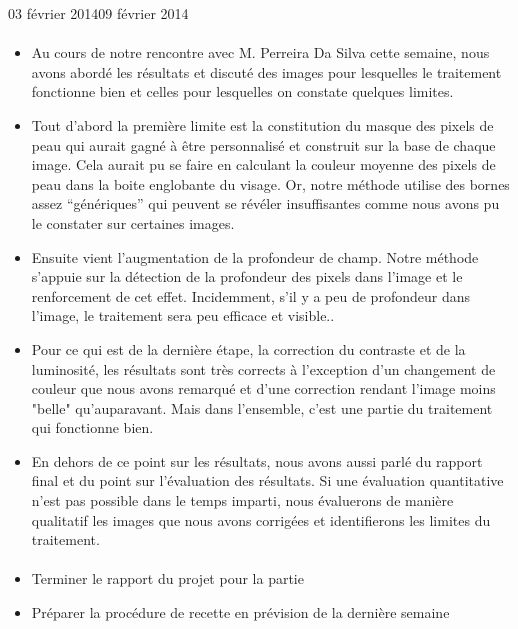 \documentclass[11pt, french]{report-rd-info}
\begin{document}
\begin{fichesuivi}{03 février 2014}{09 février 2014}
\paragraph{}
	\begin{echange}
		\begin{itemize}
			\item Au cours de notre rencontre avec M. Perreira Da Silva cette semaine, nous avons abordé les résultats et discuté des images pour lesquelles le traitement fonctionne bien et celles pour lesquelles on constate quelques limites.
			\item Tout d’abord la première limite est la constitution du masque des pixels de peau qui aurait gagné à être personnalisé et construit sur la base de chaque image. Cela aurait pu se faire en calculant la couleur moyenne des pixels de peau dans la boite englobante du visage. Or, notre méthode utilise des bornes assez “génériques” qui peuvent se révéler insuffisantes comme nous avons pu le constater sur certaines images.
			\item Ensuite vient l’augmentation de la profondeur de champ. Notre méthode s’appuie sur la détection de la profondeur des pixels dans l’image et le renforcement de cet effet. Incidemment, s’il y a peu de profondeur dans l’image, le traitement sera peu efficace et visible..
	\item Pour ce qui est de la dernière étape, la correction du contraste et de la luminosité, les résultats sont très corrects à l’exception d’un changement de couleur que nous avons remarqué et d’une correction rendant l’image moins "belle" qu’auparavant. Mais dans l’ensemble, c’est une partie du traitement qui fonctionne bien.
	\item En dehors de ce point sur les résultats, nous avons aussi parlé du rapport final et du point sur l’évaluation des résultats. Si une évaluation quantitative n’est pas possible dans le temps imparti, nous évaluerons de manière qualitatif les images que nous avons corrigées et identifierons les limites du traitement.
		\end{itemize}
	\end{echange}

\paragraph*{}
	\begin{planification}
		\begin{itemize}
			\item Terminer le rapport du projet pour la partie 
			\item Préparer la procédure de recette en prévision de la dernière semaine
\end{itemize}
	\end{planification}
\end{fichesuivi}
\end{document}
